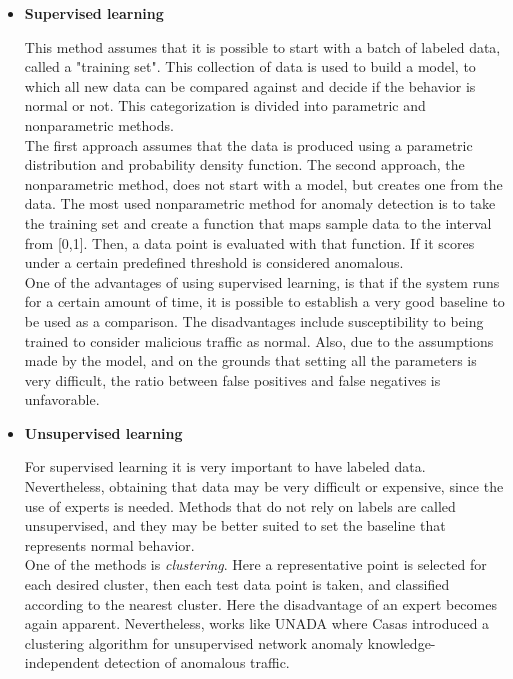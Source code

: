 	\begin{itemize}
		\item \textbf{Supervised learning}
		
This method assumes that it is possible to start with a batch of labeled data, called a "training set". This collection of data is used to build a model, to which all new data can be compared against and decide if the behavior is normal or not. This categorization is divided into parametric and nonparametric methods. \\
The first approach assumes that the data is produced using a parametric distribution and probability density function.
The second approach, the nonparametric method, does not start with a model, but creates one from the data. The most used nonparametric method for anomaly detection is to take the training set and create a function that maps sample data to the interval from [0,1]. Then, a data point is evaluated with that function. If it scores under a certain predefined threshold is considered anomalous.\\
One of the advantages of using supervised learning, is that if the system runs for a certain amount of time, it is possible to establish a very good baseline to be used as a comparison. The disadvantages include susceptibility to being trained to consider malicious traffic as normal. Also, due to the assumptions made by the model, and on the grounds that setting all the parameters is very difficult, the ratio between false positives and false negatives is unfavorable.\\

		\item \textbf{Unsupervised learning}
		
For supervised learning it is very important to have labeled data. Nevertheless, obtaining that data may be very difficult or expensive, since the use of experts is needed. Methods that do not rely on labels are called unsupervised, and they may be better suited to set the baseline that represents normal behavior. \\

One of the methods is \textit{clustering}. Here a representative point is selected for each desired cluster, then each test data point is taken, and classified according to the nearest cluster. Here the disadvantage of an expert becomes again apparent. Nevertheless, works like UNADA \cite{unada} where Casas \etAl{} introduced a clustering algorithm for unsupervised network anomaly knowledge-independent detection of anomalous traffic. 


\end{itemize}
